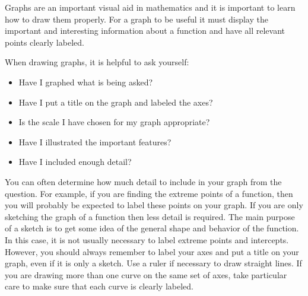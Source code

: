 %
%
%
%
%
%
%


Graphs are an important visual aid in mathematics and it is important to
learn how to draw them properly.  For a graph to be useful it must display
the important and interesting information about a function and have all
relevant points clearly labeled.  

When drawing graphs, it is helpful to
ask yourself:
\begin{itemize}
\item Have I graphed what is being asked?  
\item Have I put a title on the  graph and labeled the axes?  
\item Is the scale I have chosen for my graph appropriate?
\item Have I illustrated the important features?
\item Have I included enough detail?
\end{itemize}

You can often determine how much detail to include in your graph from the
question.  For example, if you are finding the extreme points of a
function, then you will probably be expected to label these points on your
graph.  If you are only sketching the graph of a function then less detail
is required.  The main purpose of a sketch is to get some idea of the
general shape and behavior of the function.  In this case, it is not
usually necessary to label extreme points and intercepts.  However, you
should always remember to label your axes and put a title on your graph,
even if it is only a sketch.  Use a ruler if necessary to draw
straight lines. If 
you are drawing more than one curve on the same set of axes, take
particular care to make sure that each curve is clearly labeled.



